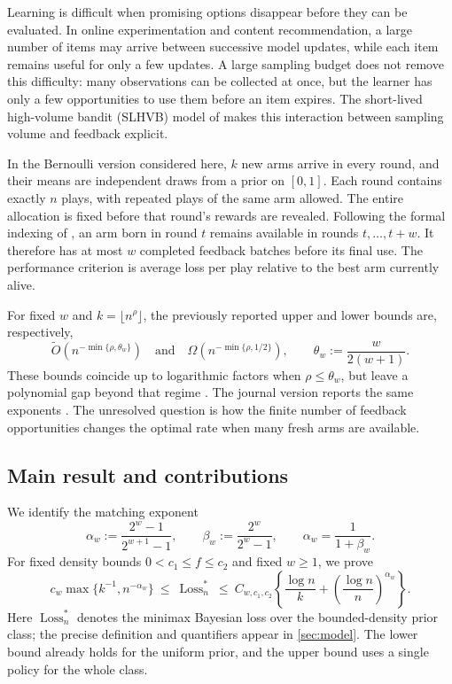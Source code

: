 \documentclass[11pt,letterpaper]{article}
\numberwithin{equation}{section}
\theoremstyle{definition}
\theoremstyle{remark}
\newcommand{\1}{\mathbf{1}}
\newcommand{\Loss}{\operatorname{Loss}}
\newcommand{\wtO}{\widetilde{O}}
\begin{document}
Learning is difficult when promising options disappear before they can be
evaluated. In online experimentation and content recommendation, a large
number of items may arrive between successive model updates, while each item
remains useful for only a few updates. A large sampling budget does not
remove this difficulty: many observations can be collected at once, but the
learner has only a few opportunities to use them before an item expires.
The short-lived high-volume bandit (SLHVB) model of
\citet{jia2023short,jia2026short} makes this interaction between sampling
volume and feedback explicit.

In the Bernoulli version considered here, $k$ new arms arrive in every round,
and their means are independent draws from a prior on $[0,1]$. Each round
contains exactly $n$ plays, with repeated plays of the same arm allowed.
The entire allocation is fixed before that round's rewards are revealed.
Following the formal indexing of \citet{jia2023short}, an arm born in round
$t$ remains available in rounds $t,\ldots,t+w$. It therefore has at most
$w$ completed feedback batches before its final use. The performance
criterion is average loss per play relative to the best arm currently alive.

For fixed $w$ and $k=\lfloor n^\rho\rfloor$, the previously reported
upper and lower bounds are, respectively,
\begin{equation}\label{eq:previous-rates}
  \wtO\!\left(n^{-\min\{\rho,\theta_w\}}\right)
  \quad\text{and}\quad
  \Omega\!\left(n^{-\min\{\rho,1/2\}}\right),
  \qquad \theta_w:=\frac{w}{2(w+1)}.
\end{equation}
These bounds coincide up to logarithmic factors when
$\rho\le\theta_w$, but leave a polynomial gap beyond that regime
\citep[Theorems 3.3 and 4.10]{jia2023short}.
The journal version reports the same exponents \citep{jia2026short}.
The unresolved question is how the finite number of feedback opportunities
changes the optimal rate when many fresh arms are available.

\subsection{Main result and contributions}

We identify the matching exponent
\begin{equation}\label{eq:alpha-beta-def}
  \alpha_w:=\frac{2^w-1}{2^{w+1}-1},
  \qquad
  \beta_w:=\frac{2^w}{2^w-1},
  \qquad
  \alpha_w=\frac{1}{1+\beta_w}.
\end{equation}
For fixed density bounds $0<c_1\le f\le c_2$ and fixed $w\ge1$,
we prove
\begin{equation}\label{eq:intro-main}
  c_w\max\{k^{-1},n^{-\alpha_w}\}
  \ \le\ \Loss_n^*
  \ \le\
  C_{w,c_1,c_2}\left\{
    \frac{\log n}{k}+
    \left(\frac{\log n}{n}\right)^{\alpha_w}
  \right\}.
\end{equation}
Here $\Loss_n^*$ denotes the minimax Bayesian loss over the bounded-density
prior class; the precise definition and quantifiers appear in
\cref{sec:model}. The lower bound already holds for the uniform prior, and
the upper bound uses a single policy for the whole class.
\end{document}
